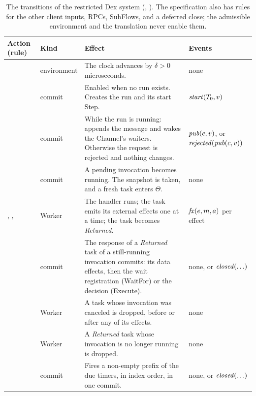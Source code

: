 \begin{table}[t]
\centering
\small
\begin{tabularx}{\textwidth}{@{}P{3.1cm}P{1.9cm}LP{2.9cm}@{}}
\toprule
Action (rule) & Kind & Effect & Events \\
\midrule
{}  & environment & The clock advances by
  $\delta > 0$ microseconds. & none \\
  & commit & Enabled when no run exists.
  Creates the run and its start Step. & $\mathit{start}(T_0, v)$ \\
  & commit & While the run is running:
  appends the message and wakes the Channel's waiters. Otherwise the request
  is rejected and nothing changes. & $\mathit{pub}(c, v)$, or
  $\mathit{rejected}(\mathit{pub}(c, v))$ \\
  & commit & A pending invocation
  becomes running. The snapshot is taken, and a fresh task enters
  $\Theta$. & none \\
, , 
   & Worker & The handler runs; the task emits its
  external effects one at a time; the task becomes \emph{Returned}. &
  $\mathit{fx}(e, m, a)$ per effect \\
  & commit & The response of a
  \emph{Returned} task of a still-running invocation commits: its data
  effects, then the wait registration (WaitFor) or the decision (Execute). &
  none, or $\mathit{closed}(\ldots)$ \\
  & Worker & A task whose
  invocation was canceled is dropped, before or after any of its effects. &
  none \\
  & Worker & A
  \emph{Returned} task whose invocation is no longer running is dropped. &
  none \\
  & commit & Fires a non-empty prefix
  of the due timers, in index order, in one commit. & none, or
  $\mathit{closed}(\ldots)$ \\
\bottomrule
\end{tabularx}
\caption{The transitions of the restricted Dex system
(, ). The specification also has rules
for the other client inputs, RPCs, SubFlows, and a deferred close; the
admissible environment and the translation never enable them.}
\label{tab:rules}
\end{table}

